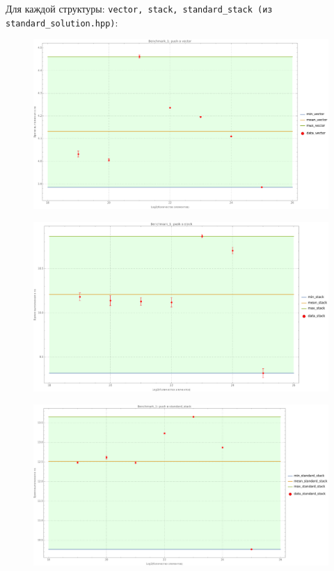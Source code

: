 Для каждой структуры: \texttt{vector, stack, standard_stack (из \texttt{standard_solution.hpp})}:
\begin{figure}[H]
  \centering
  \includegraphics[width=1.0\textwidth]{../../resources/benchmark_1_3.png}
  \caption{}
\end{figure}
\begin{figure}[H]
  \centering
  \includegraphics[width=1.0\textwidth]{../../resources/benchmark_1_4.png}
  \caption{}
\end{figure}
\begin{figure}[H]
  \centering
  \includegraphics[width=1.0\textwidth]{../../resources/benchmark_1_5.png}
  \caption{}
\end{figure}

